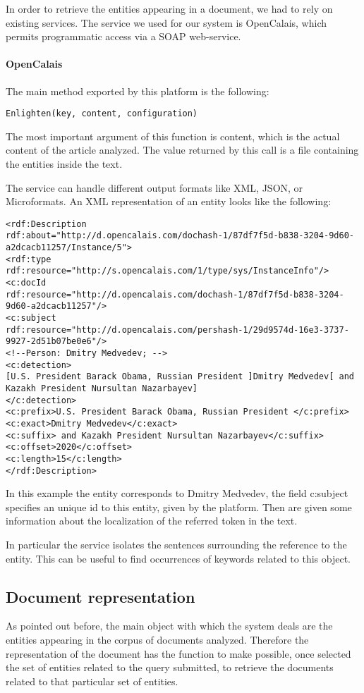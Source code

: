 \documentclass{acm_proc_article-sp-sigmod07}
\begin{document}
In order to retrieve the entities appearing in a document, we had to rely
on existing services. The service we used for our system is OpenCalais,
which permits programmatic access via a SOAP web-service.

\paragraph{OpenCalais}
The main method exported by this platform is the following:
\begin{verbatim}
Enlighten(key, content, configuration)
\end{verbatim}
The most important argument of this function is content, which is the
actual content of the article analyzed. The value returned by this call is
a file containing the entities inside the text.

The service can handle different output formats like XML, JSON, or
Microformats. An XML representation of an entity looks like the
following:
\begin{lstlisting}
<rdf:Description
rdf:about="http://d.opencalais.com/dochash-1/87df7f5d-b838-3204-9d60-a2dcacb11257/Instance/5">
<rdf:type rdf:resource="http://s.opencalais.com/1/type/sys/InstanceInfo"/>
<c:docId
rdf:resource="http://d.opencalais.com/dochash-1/87df7f5d-b838-3204-9d60-a2dcacb11257"/>
<c:subject
rdf:resource="http://d.opencalais.com/pershash-1/29d9574d-16e3-3737-9927-2d51b07be0e6"/>
<!--Person: Dmitry Medvedev; -->
<c:detection>
[U.S. President Barack Obama, Russian President ]Dmitry Medvedev[ and
Kazakh President Nursultan Nazarbayev]
</c:detection>
<c:prefix>U.S. President Barack Obama, Russian President </c:prefix>
<c:exact>Dmitry Medvedev</c:exact>
<c:suffix> and Kazakh President Nursultan Nazarbayev</c:suffix>
<c:offset>2020</c:offset>
<c:length>15</c:length>
</rdf:Description>
\end{lstlisting}

In this example the entity corresponds to Dmitry Medvedev, the field
c:subject specifies an unique id to this entity, given by the platform.
Then are given some information about the localization of the referred
token in the text.

In particular the service isolates the sentences surrounding the
reference to the entity. This can be useful to find occurrences of
keywords related to this object.

\subsection{Document representation}
As pointed out before, the main object with which the system deals are the
entities appearing in the corpus of documents analyzed. Therefore the
representation of the document has the function to make possible, once
selected the set of entities related to the query submitted, to retrieve
the documents related to that particular set of entities.
\end{document}
